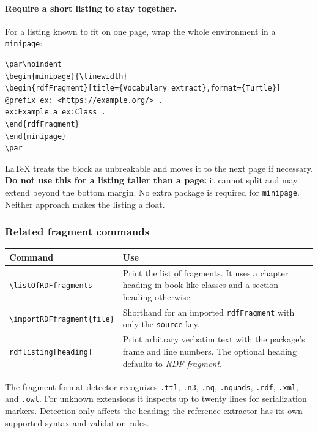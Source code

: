 \documentclass[10pt,letterpaper]{article}
\newcommand{\key}[1]{\texttt{#1}}
\begin{document}
\paragraph{Require a short listing to stay together.}
For a listing known to fit on one page, wrap the whole environment in a
\verb|minipage|:
\begin{lstlisting}
\par\noindent
\begin{minipage}{\linewidth}
\begin{rdfFragment}[title={Vocabulary extract},format={Turtle}]
@prefix ex: <https://example.org/> .
ex:Example a ex:Class .
\end{rdfFragment}
\end{minipage}
\par
\end{lstlisting}
LaTeX treats the block as unbreakable and moves it to the next page if
necessary. \textbf{Do not use this for a listing taller than a page:}
it cannot split and may extend beyond the bottom margin. No extra package
is required for \verb|minipage|. Neither approach makes the listing a float.

\subsubsection{Related fragment commands}

\begin{longtable}{p{.33\linewidth}p{.57\linewidth}}
\textbf{Command} & \textbf{Use}\\
\hline
\verb|\listOfRDFfragments| & Print the list of fragments. It uses a chapter
heading in book-like classes and a section heading otherwise.\\
\verb|\importRDFfragment{file}| & Shorthand for an imported
\verb|rdfFragment| with only the \key{source} key.\\
\verb|rdflisting[heading]| & Print arbitrary
verbatim text with the package's frame and line numbers. The optional heading
defaults to \emph{RDF fragment}.\\
\end{longtable}

The fragment format detector recognizes \texttt{.ttl}, \texttt{.n3},
\texttt{.nq}, \texttt{.nquads}, \texttt{.rdf}, \texttt{.xml}, and
\texttt{.owl}. For unknown extensions it inspects up to twenty lines for
serialization markers. Detection only affects the heading; the reference
extractor has its own supported syntax and validation rules.
\end{document}
